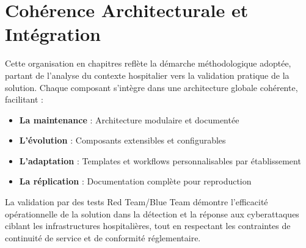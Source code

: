 \section{Cohérence Architecturale et Intégration}

Cette organisation en chapitres reflète la démarche méthodologique adoptée, partant de l'analyse du contexte hospitalier vers la validation pratique de la solution. Chaque composant s'intègre dans une architecture globale cohérente, facilitant :

\begin{itemize}
    \item \textbf{La maintenance} : Architecture modulaire et documentée
    \item \textbf{L'évolution} : Composants extensibles et configurables
    \item \textbf{L'adaptation} : Templates et workflows personnalisables par établissement
    \item \textbf{La réplication} : Documentation complète pour reproduction
\end{itemize}

La validation par des tests Red Team/Blue Team démontre l'efficacité opérationnelle de la solution dans la détection et la réponse aux cyberattaques ciblant les infrastructures hospitalières, tout en respectant les contraintes de continuité de service et de conformité réglementaire.

\newpage
